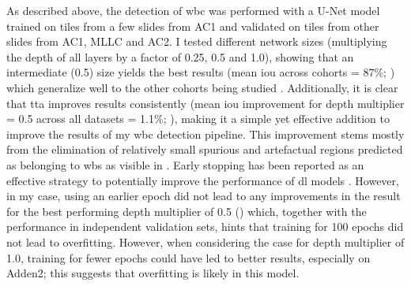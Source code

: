 As described above, the detection of \ac{wbc} was performed with a U-Net model \cite{Ronneberger2015-do} trained on tiles from a few slides from AC1 and validated on tiles from other slides from AC1, MLLC and AC2. I tested different network sizes (multiplying the depth of all layers by a factor of 0.25, 0.5 and 1.0), showing that an intermediate (0.5) size yields the best results (mean \ac{iou} across cohorts = 87\%; ) which generalize well to the other cohorts being studied . Additionally, it is clear that \ac{tta} improves results consistently (mean \ac{iou} improvement for depth multiplier = 0.5 across all datasets = 1.1\%; ), making it a simple yet effective addition to improve the results of my \ac{wbc} detection pipeline. This improvement stems mostly from the elimination of relatively small spurious and artefactual regions predicted as belonging to \ac{wbs} as visible in . Early stopping has been reported as an effective strategy to potentially improve the performance of \ac{dl} models \cite{Prechelt2012-xf}. However, in my case, using an earlier epoch did not lead to any improvements in the result for the best performing depth multiplier of 0.5 () which, together with the performance in independent validation sets, hints that training for 100 epochs did not lead to overfitting. However, when considering the case for depth multiplier of 1.0, training for fewer epochs could have led to better results, especially on Adden2; this suggests that overfitting is likely in this model.

\begin{figure}[!ht]
    \label{fig:u-net-validation}
\end{figure}

\begin{figure}[!ht]
    \label{fig:u-net-tta}
\end{figure}

\begin{figure}[!ht]
    \label{fig:u-net-early-stopping}
\end{figure}

